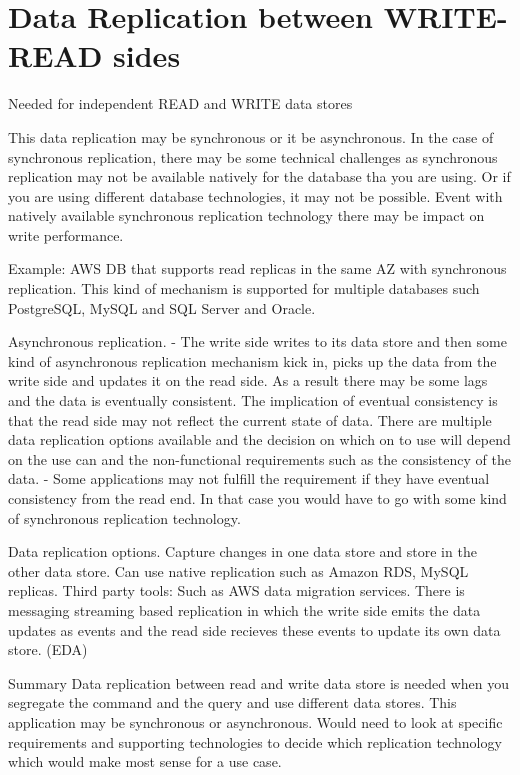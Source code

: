 \documentclass[a4paper, 11pt]{book}
\begin{document}
    \section{Data Replication between WRITE-READ sides}
    Needed for independent READ and WRITE data stores

    This data replication may be synchronous or it be asynchronous.
    In the case of synchronous replication, there may be some technical challenges as synchronous replication may not be available natively for the database tha you are using.
    Or if you are using different database technologies, it may not be possible.
    Event with natively available synchronous replication technology there may be impact on write performance.

    Example: AWS DB that supports read replicas in the same AZ with synchronous replication.
    This kind of mechanism is supported for multiple databases such PostgreSQL, MySQL and SQL Server and Oracle.

    Asynchronous replication.
    - The write side writes to its data store and then some kind of asynchronous replication mechanism kick in, picks up the data from the write side and updates it on the read side.
    As a result there may be some lags and the data is eventually consistent.
    The implication of eventual consistency is that the read side may not reflect the current state of data.
    There are multiple data replication options available and the decision on which on to use will depend on the use can and the non-functional requirements such as the consistency of the data.
    - Some applications may not fulfill the requirement if they have eventual consistency from the read end.
    In that case you would have to go with some kind of synchronous replication technology.

    Data replication options.
    Capture changes in one data store and store in the other data store.
    Can use native replication such as Amazon RDS, MySQL replicas.
    Third party tools: Such as AWS data migration services.
    There is messaging streaming based replication in which the write side emits the data updates as events and the read side recieves these events to update its own data store. (EDA)

    Summary
    Data replication between read and write data store is needed when you segregate the command and the query and use different data stores.
    This application may be synchronous or asynchronous.
    Would need to look at specific requirements and supporting technologies to decide which replication technology which would make most sense for a use case.
\end{document}
